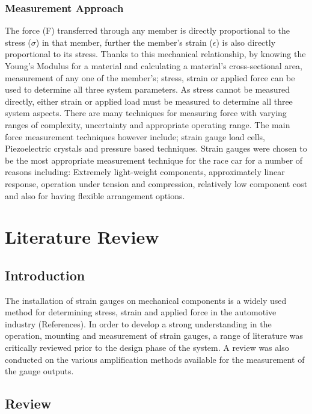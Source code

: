 \subsubsection{Measurement Approach}
The force (F) transferred through any member is directly proportional to the stress ($\sigma$) in that member, further the member's strain ($\epsilon$) is also directly proportional to its stress. Thanks to this mechanical relationship, by knowing the Young's Modulus for a material and calculating a material's cross-sectional area, measurement of any one of the member's; stress, strain or applied force can be used to determine all three system parameters. As stress cannot be measured directly, either strain or applied load must be measured to determine all three system aspects. There are many techniques for measuring force with varying ranges of complexity, uncertainty and appropriate operating range. The main force measurement techniques however include; strain gauge load cells, Piezoelectric crystals and pressure based techniques. Strain gauges were chosen to be the most appropriate measurement technique for the race car for a number of reasons including: Extremely light-weight components, approximately linear response, operation under tension and compression, relatively low component cost and also for having flexible arrangement options.\\


\section{Literature Review}
\subsection{Introduction}
The installation of strain gauges on mechanical components is a widely used method for determining stress, strain and applied force in the automotive industry (References).
In order to develop a strong understanding in the operation, mounting and measurement of strain gauges, a range of literature was critically reviewed prior to the design phase of the system. A review was also conducted on the various amplification methods available for the measurement of the gauge outputs. 

\subsection{Review}
